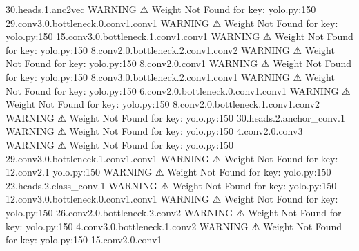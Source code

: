                              30.heads.1.anc2vec                                   
                    WARNING  ⚠ Weight Not Found for key:               yolo.py:150
                             29.conv3.0.bottleneck.0.conv1.conv1                  
                    WARNING  ⚠ Weight Not Found for key:               yolo.py:150
                             15.conv3.0.bottleneck.1.conv1.conv1                  
                    WARNING  ⚠ Weight Not Found for key:               yolo.py:150
                             8.conv2.0.bottleneck.2.conv1.conv2                   
                    WARNING  ⚠ Weight Not Found for key:               yolo.py:150
                             8.conv2.0.conv1                                      
                    WARNING  ⚠ Weight Not Found for key:               yolo.py:150
                             8.conv3.0.bottleneck.2.conv1.conv1                   
                    WARNING  ⚠ Weight Not Found for key:               yolo.py:150
                             6.conv2.0.bottleneck.0.conv1.conv1                   
                    WARNING  ⚠ Weight Not Found for key:               yolo.py:150
                             8.conv2.0.bottleneck.1.conv1.conv2                   
                    WARNING  ⚠ Weight Not Found for key:               yolo.py:150
                             30.heads.2.anchor_conv.1                             
                    WARNING  ⚠ Weight Not Found for key:               yolo.py:150
                             4.conv2.0.conv3                                      
                    WARNING  ⚠ Weight Not Found for key:               yolo.py:150
                             29.conv3.0.bottleneck.1.conv1.conv1                  
                    WARNING  ⚠ Weight Not Found for key: 12.conv2.1    yolo.py:150
                    WARNING  ⚠ Weight Not Found for key:               yolo.py:150
                             22.heads.2.class_conv.1                              
                    WARNING  ⚠ Weight Not Found for key:               yolo.py:150
                             12.conv3.0.bottleneck.0.conv1.conv1                  
                    WARNING  ⚠ Weight Not Found for key:               yolo.py:150
                             26.conv2.0.bottleneck.2.conv2                        
                    WARNING  ⚠ Weight Not Found for key:               yolo.py:150
                             4.conv3.0.bottleneck.1.conv2                         
                    WARNING  ⚠ Weight Not Found for key:               yolo.py:150
                             15.conv2.0.conv1                                     
